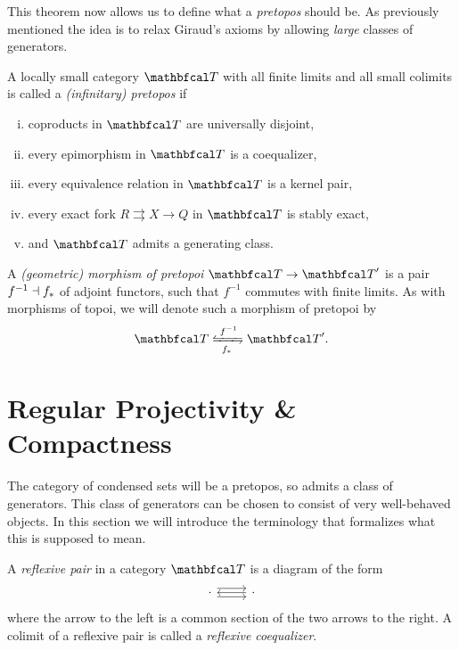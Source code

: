 This theorem now allows us to define what a \emph{pretopos} should be. As previously mentioned the idea is to relax Giraud's axioms by allowing \emph{large} classes of generators.
\begin{definition}
	\label{definition: pretopoi}
	
	A locally small category $\category T$ with all finite limits and all small colimits is called a \emph{(infinitary) pretopos} if
	\begin{enumerate}[(i)]
		\item
		\label{definition: pretopoi, coproducts are universally disjoint}
		coproducts in $\category T$ are universally disjoint,
		
		\item
		\label{definition: pretopoi, every epimorphism is a coequalizer}
		every epimorphism in $\category T$ is a coequalizer,
		
		\item
		\label{definition: pretopoi, every equivalence relation is a kernel pair}
		every equivalence relation in $\category T$ is a kernel pair,
		
		\item
		\label{definition: pretopoi, every exact fork is stably exact}
		every exact fork $R\rightrightarrows X\to Q$ in $\category T$ is stably exact,
		
		\item
		\label{definition: pretopoi, existence of a generating class}
		and $\category T$ admits a generating class.
	\end{enumerate}
	
	A \emph{(geometric) morphism of pretopoi} $\category T\to\category T'$ is a pair $f^{-1}\dashv f_\ast$ of adjoint functors, such that $f^{-1}$ commutes with finite limits. As with morphisms of topoi, we will denote such a morphism of pretopoi by
		$$\category T \xleftrightarrows{f^{-1}}{f_\ast} \category T'.$$
\end{definition}

\section{Regular Projectivity \& Compactness}

The category of condensed sets will be a pretopos, so admits a class of generators. This class of generators can be chosen to consist of very well-behaved objects. In this section we will introduce the terminology that formalizes what this is supposed to mean.
\begin{definition}
	A \emph{reflexive pair} in a category $\category T$ is a diagram of the form
		$$\begin{tikzcd}
			\cdot \ar[r, shift left=0.35em]\ar[r, shift right=0.35em] &\cdot\ar[l]
		\end{tikzcd}$$
	where the arrow to the left is a common section of the two arrows to the right. A colimit of a reflexive pair is called a \emph{reflexive coequalizer}.
\end{definition}

